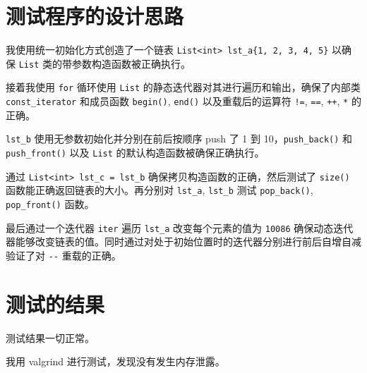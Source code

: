 \documentclass[UTF8]{ctexart}
\begin{document}
\pagestyle{fancy}
\fancyhead{}

\section{测试程序的设计思路}
我使用统一初始化方式创造了一个链表 \verb|List<int> lst_a{1, 2, 3, 4, 5}| 以确保 \verb|List| 类的带参数构造函数被正确执行。

接着我使用 \verb|for| 循环使用 \verb|List| 的静态迭代器对其进行遍历和输出，确保了内部类 \verb|const_iterator| 和成员函数 \verb|begin()|, \verb|end()| 以及重载后的运算符 \verb|!=|, \verb|==|, \verb|++|, \verb|*| 的正确。

\verb|lst_b| 使用无参数初始化并分别在前后按顺序 push 了 1 到 10，\verb|push_back()| 和 \verb|push_front()| 以及 \verb|List| 的默认构造函数被确保正确执行。

通过 \verb|List<int> lst_c = lst_b| 确保拷贝构造函数的正确，然后测试了 \verb|size()| 函数能正确返回链表的大小。再分别对 \verb|lst_a|, \verb|lst_b| 测试 \verb|pop_back()|, \verb|pop_front()| 函数。

最后通过一个迭代器 \verb|iter| 遍历 \verb|lst_a| 改变每个元素的值为 \verb|10086| 确保动态迭代器能够改变链表的值。同时通过对处于初始位置时的迭代器分别进行前后自增自减验证了对 \verb|--| 重载的正确。

\section{测试的结果}
测试结果一切正常。

我用 valgrind 进行测试，发现没有发生内存泄露。
\end{document}
